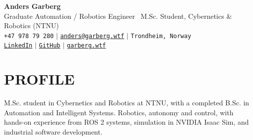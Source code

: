 \documentclass[a4paper,11pt]{article}
\newcommand{\resumeBlockStart}{\begin{itemize}[leftmargin=0in, label={}]}
\newcommand{\resumeBlockEnd}{\end{itemize}}
\begin{document}
\begin{center}
    \textbf{\Huge Anders Garberg} \\ \vspace{5pt}
    \small
    Graduate Automation / Robotics Engineer \textbullet\ M.Sc. Student, Cybernetics \& Robotics (NTNU)
    \\ \vspace{7pt}
    \small
    \faPhone* \hspace{2pt} \texttt{+47 978 79 280} \hspace{6pt} $|$ \hspace{6pt}
    \faEnvelope \hspace{2pt} \href{mailto:anders@garberg.wtf}{\texttt{anders@garberg.wtf}} \hspace{6pt} $|$  \hspace{6pt}
    \faMapMarker* \hspace{2pt}\texttt{Trondheim, Norway} \hspace{6pt} \\ \vspace{3pt}
    \faLinkedin \hspace{2pt} \href{https://no.linkedin.com/in/anders-garberg}{\texttt{LinkedIn}} \hspace{6pt} $|$ \hspace{6pt}
    \faGithub \hspace{2pt} \href{https://github.com/andersgar/}{\texttt{GitHub}} \hspace{6pt} $|$ \hspace{6pt}
    \faGlobeEurope \hspace{2pt} \href{https://garberg.wtf}{\texttt{garberg.wtf}} \hspace{6pt}
\end{center}

\section{PROFILE}
\resumeBlockStart
  \small{\item{
M.Sc. student in Cybernetics and Robotics at NTNU, with a completed B.Sc. in Automation and Intelligent Systems. Robotics, autonomy and control, with hands-on experience from ROS 2 systems, simulation in NVIDIA Isaac Sim, and industrial software development.
  }}
\resumeBlockEnd

\end{document}
